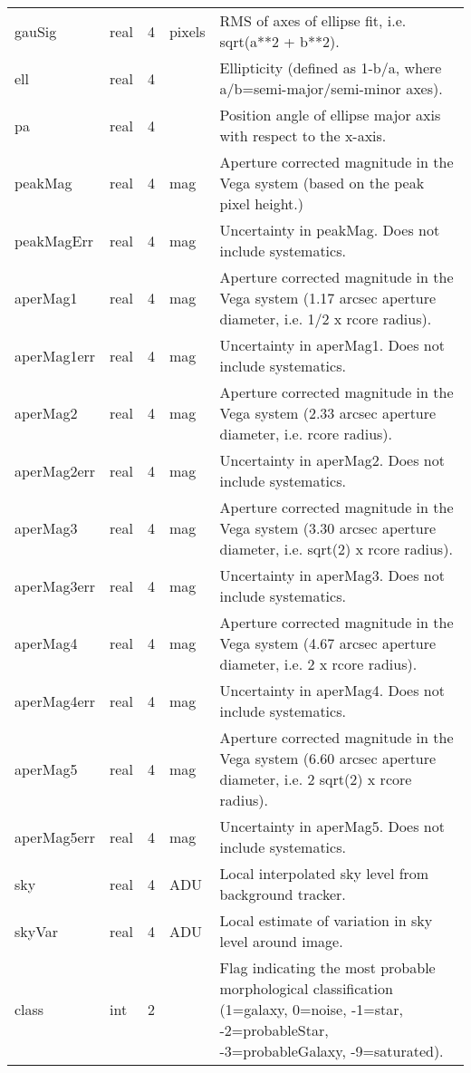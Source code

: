 \documentclass[12pt]{article}
\begin{document}
\begin{center}
\begin{longtable}{llclp{10cm}}
gauSig & real & 4 & pixels & RMS of axes of ellipse fit, i.e. sqrt(a**2 + b**2). \\
ell & real & 4 & & Ellipticity (defined as 1-b/a, where a/b=semi-major/semi-minor axes).  \\
pa & real & 4 & & Position angle of ellipse major axis with respect to the x-axis. \\

peakMag & real & 4 & mag & Aperture corrected magnitude in the Vega system 
(based on the peak pixel height.) \\
peakMagErr & real & 4 & mag & Uncertainty in peakMag. Does not include systematics. \\ 
aperMag1 & real & 4 & mag & Aperture corrected magnitude in the Vega system (1.17 arcsec aperture diameter, i.e. 1/2 x rcore radius). \\ %
aperMag1err & real & 4 & mag & Uncertainty in aperMag1. Does not include systematics. \\ 
aperMag2 & real & 4 & mag & Aperture corrected magnitude in the Vega system (2.33 arcsec aperture diameter, i.e. rcore radius). \\ %
aperMag2err & real & 4 & mag & Uncertainty in aperMag2. Does not include systematics. \\ 
aperMag3 & real & 4 & mag & Aperture corrected magnitude in the Vega system (3.30 arcsec aperture diameter, i.e. sqrt(2) x rcore radius). \\ %
aperMag3err & real & 4 & mag & Uncertainty in aperMag3. Does not include systematics. \\ 
aperMag4 & real & 4 & mag & Aperture corrected magnitude in the Vega system (4.67 arcsec aperture diameter, i.e. 2 x rcore radius). \\ %
aperMag4err & real & 4 & mag & Uncertainty in aperMag4. Does not include systematics. \\ 
aperMag5 & real & 4 & mag & Aperture corrected magnitude in the Vega system (6.60 arcsec aperture diameter, i.e. 2 sqrt(2) x rcore radius). \\ %
aperMag5err & real & 4 & mag & Uncertainty in aperMag5. Does not include systematics. \\ 
sky & real & 4 & {\sc ADU} & Local interpolated sky level from background tracker. \\
skyVar & real & 4 & {\sc ADU} & Local estimate of variation in sky level around 
image. \\
class & int & 2 & & Flag indicating the most probable morphological classification (1=galaxy, 0=noise, -1=star, -2=probableStar, -3=probableGalaxy, -9=saturated).\\

\end{longtable}
\end{center}
\end{document}
